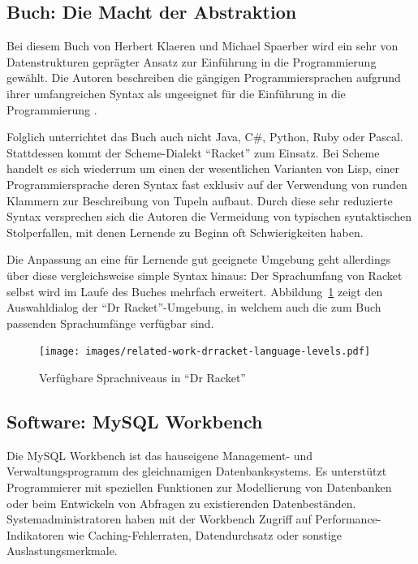 \subsection{Buch: Die Macht der Abstraktion}

Bei diesem Buch von Herbert Klaeren und Michael Spaerber wird ein sehr von Datenstrukturen geprägter Ansatz zur Einführung in die Programmierung gewählt. Die Autoren beschreiben die gängigen Programmiersprachen aufgrund ihrer umfangreichen Syntax als ungeeignet für die Einführung in die Programmierung \cite[2]{macht-der-abstraktion}. 

Folglich unterrichtet das Buch auch nicht Java, C\#, Python, Ruby oder Pascal. Stattdessen kommt der Scheme-Dialekt ``Racket'' zum Einsatz. Bei Scheme handelt es sich wiederrum um einen der wesentlichen Varianten von Lisp, einer Programmiersprache deren Syntax fast exklusiv auf der Verwendung von runden Klammern zur Beschreibung von Tupeln aufbaut. Durch diese sehr reduzierte Syntax versprechen sich die Autoren die Vermeidung von typischen syntaktischen Stolperfallen, mit denen Lernende zu Beginn oft Schwierigkeiten haben.

Die Anpassung an eine für Lernende gut geeignete Umgebung geht allerdings über diese vergleichsweise simple Syntax hinaus: Der Sprachumfang von Racket selbst wird im Laufe des Buches mehrfach erweitert. Abbildung~\ref{fig:drracket-language-levels} zeigt den Auswahldialog der ``Dr Racket''-Umgebung, in welchem auch die zum Buch passenden Sprachumfänge verfügbar sind.

\begin{figure}[h]
  \centering \texttt{[image: images/related-work-drracket-language-levels.pdf]}
  \caption{Verfügbare Sprachniveaus in ``Dr Racket''}
  \label{fig:drracket-language-levels}
\end{figure}

\subsection{Software: MySQL Workbench}

Die MySQL Workbench ist das hauseigene Management- und Verwaltungsprogramm des gleichnamigen Datenbanksystems. Es unterstützt Programmierer mit speziellen Funktionen zur Modellierung von Datenbanken oder beim Entwickeln von Abfragen zu existierenden Datenbeständen. Systemadministratoren haben mit der Workbench Zugriff auf Performance-Indikatoren wie Caching-Fehlerraten, Datendurchsatz oder sonstige Auslastungsmerkmale.

